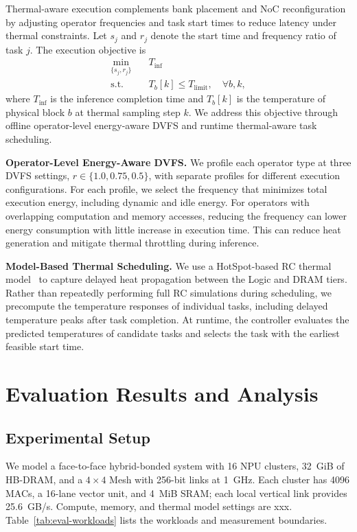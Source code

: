 \documentclass[conference,10pt]{IEEEtran}
\begin{document}
Thermal-aware execution complements bank placement and
NoC reconfiguration by adjusting operator frequencies and
task start times to reduce latency under thermal constraints.
Let $s_j$ and $r_j$ denote the start time and frequency
ratio of task $j$. The execution objective is
\begin{equation}
\begin{aligned}
  \min_{\{s_j,r_j\}} \quad & T_{\mathrm{inf}} \\
  \mathrm{s.t.}\quad
  & T_b[k]\leq T_{\mathrm{limit}},\quad \forall b,k,
\end{aligned}
\label{eq:thermal-optimization}
\end{equation}
where $T_{\mathrm{inf}}$ is the inference completion time
and $T_b[k]$ is the temperature of physical block $b$ at
thermal sampling step $k$.
We address this objective through offline operator-level
energy-aware DVFS and runtime thermal-aware task scheduling.


\noindent\textbf{Operator-Level Energy-Aware DVFS.}
We profile each operator type at three DVFS settings, $r\in\{1.0,0.75,0.5\}$, with separate profiles for different execution configurations. For each profile, we select the frequency that minimizes total execution energy, including dynamic and idle energy. For operators with overlapping computation and memory accesses, reducing the frequency can lower energy consumption with little increase in execution time. This can reduce heat generation and mitigate thermal throttling during inference.

\noindent\textbf{Model-Based Thermal Scheduling.}
We use a HotSpot-based RC thermal model~\cite{hotspot_tool} to capture delayed heat propagation between the Logic and DRAM tiers. Rather than repeatedly performing full RC simulations during scheduling, we precompute the temperature responses of individual tasks, including delayed temperature peaks after task completion. At runtime, the controller evaluates the predicted temperatures of candidate tasks and selects the task with the earliest feasible start time.

\FloatBarrier

\section{Evaluation Results and Analysis}
\label{sec:experiment}

\subsection{Experimental Setup}
We model a face-to-face hybrid-bonded system with 16 NPU clusters,
32~GiB of HB-DRAM, and a $4\times4$ Mesh with 256-bit links at 1~GHz.
Each cluster has 4096 MACs, a 16-lane vector unit, and 4~MiB SRAM;
each local vertical link provides 25.6~GB/s. Compute, memory, and
thermal model settings are xxx. Table~\ref{tab:eval-workloads} lists
the workloads and measurement boundaries.
\end{document}
